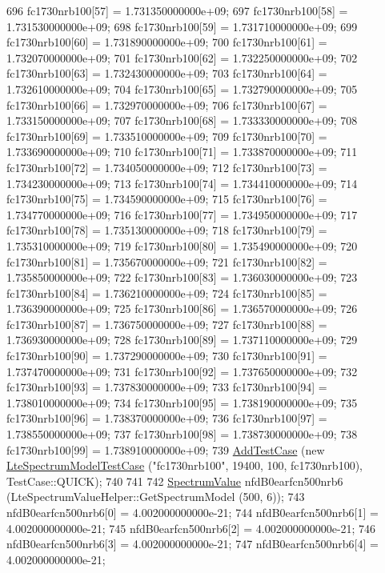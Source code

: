 \begin{DoxyCode}
696   fc1730nrb100[57] = 1.731350000000e+09;
697   fc1730nrb100[58] = 1.731530000000e+09;
698   fc1730nrb100[59] = 1.731710000000e+09;
699   fc1730nrb100[60] = 1.731890000000e+09;
700   fc1730nrb100[61] = 1.732070000000e+09;
701   fc1730nrb100[62] = 1.732250000000e+09;
702   fc1730nrb100[63] = 1.732430000000e+09;
703   fc1730nrb100[64] = 1.732610000000e+09;
704   fc1730nrb100[65] = 1.732790000000e+09;
705   fc1730nrb100[66] = 1.732970000000e+09;
706   fc1730nrb100[67] = 1.733150000000e+09;
707   fc1730nrb100[68] = 1.733330000000e+09;
708   fc1730nrb100[69] = 1.733510000000e+09;
709   fc1730nrb100[70] = 1.733690000000e+09;
710   fc1730nrb100[71] = 1.733870000000e+09;
711   fc1730nrb100[72] = 1.734050000000e+09;
712   fc1730nrb100[73] = 1.734230000000e+09;
713   fc1730nrb100[74] = 1.734410000000e+09;
714   fc1730nrb100[75] = 1.734590000000e+09;
715   fc1730nrb100[76] = 1.734770000000e+09;
716   fc1730nrb100[77] = 1.734950000000e+09;
717   fc1730nrb100[78] = 1.735130000000e+09;
718   fc1730nrb100[79] = 1.735310000000e+09;
719   fc1730nrb100[80] = 1.735490000000e+09;
720   fc1730nrb100[81] = 1.735670000000e+09;
721   fc1730nrb100[82] = 1.735850000000e+09;
722   fc1730nrb100[83] = 1.736030000000e+09;
723   fc1730nrb100[84] = 1.736210000000e+09;
724   fc1730nrb100[85] = 1.736390000000e+09;
725   fc1730nrb100[86] = 1.736570000000e+09;
726   fc1730nrb100[87] = 1.736750000000e+09;
727   fc1730nrb100[88] = 1.736930000000e+09;
728   fc1730nrb100[89] = 1.737110000000e+09;
729   fc1730nrb100[90] = 1.737290000000e+09;
730   fc1730nrb100[91] = 1.737470000000e+09;
731   fc1730nrb100[92] = 1.737650000000e+09;
732   fc1730nrb100[93] = 1.737830000000e+09;
733   fc1730nrb100[94] = 1.738010000000e+09;
734   fc1730nrb100[95] = 1.738190000000e+09;
735   fc1730nrb100[96] = 1.738370000000e+09;
736   fc1730nrb100[97] = 1.738550000000e+09;
737   fc1730nrb100[98] = 1.738730000000e+09;
738   fc1730nrb100[99] = 1.738910000000e+09;
739   \hyperlink{classns3_1_1TestCase_a3718088e3eefd5d6454569d2e0ddd835}{AddTestCase} (\textcolor{keyword}{new} \hyperlink{classLteSpectrumModelTestCase}{LteSpectrumModelTestCase} (\textcolor{stringliteral}{"fc1730nrb100"}, 19400, 100,
       fc1730nrb100), TestCase::QUICK);
740 
741 
742   \hyperlink{classns3_1_1SpectrumValue}{SpectrumValue} nfdB0earfcn500nrb6 (LteSpectrumValueHelper::GetSpectrumModel (500, 6));
743   nfdB0earfcn500nrb6[0] = 4.002000000000e-21;
744   nfdB0earfcn500nrb6[1] = 4.002000000000e-21;
745   nfdB0earfcn500nrb6[2] = 4.002000000000e-21;
746   nfdB0earfcn500nrb6[3] = 4.002000000000e-21;
747   nfdB0earfcn500nrb6[4] = 4.002000000000e-21;

\end{DoxyCode}
